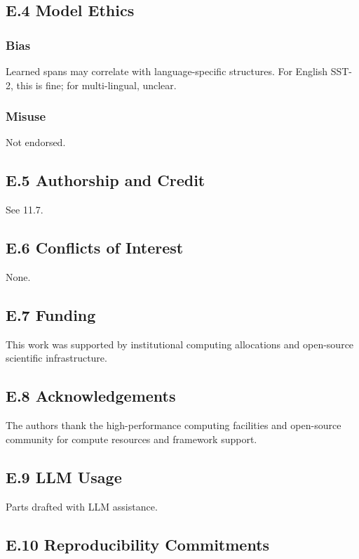 \subsection{E.4 Model Ethics}

\subsubsection{Bias}

Learned spans may correlate with language-specific structures. For English 
SST-2, this is fine; for multi-lingual, unclear.

\subsubsection{Misuse}

Not endorsed.

\subsection{E.5 Authorship and Credit}

See  11.7.

\subsection{E.6 Conflicts of Interest}

None.

\subsection{E.7 Funding}

This work was supported by institutional computing allocations and open-source scientific infrastructure.

\subsection{E.8 Acknowledgements}

The authors thank the high-performance computing facilities and open-source community for compute resources and framework support.

\subsection{E.9 LLM Usage}

Parts drafted with LLM assistance.

\subsection{E.10 Reproducibility Commitments}

